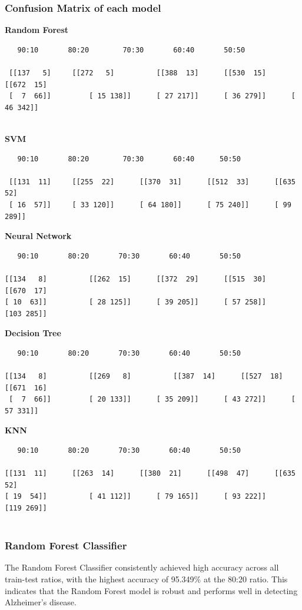 \documentclass[a4paper,12pt]{report}
\begin{document}
\subsubsection {Confusion Matrix of each model}
\textbf {Random Forest}
\begin{verbatim}
   90:10       80:20        70:30       60:40       50:50

 [[137   5]		[[272   5]			[[388  13]		[[530  15]		[[672  15]
 [  7  66]]			[ 15 138]]		[ 27 217]]		[ 36 279]]		[ 46 342]]


\end{verbatim}
\textbf {SVM}
\begin{verbatim}
   90:10       80:20        70:30       60:40      50:50

 [[131  11]		[[255  22]		[[370  31]		[[512  33]		[[635  52]
 [ 16  57]]		[ 33 120]]		[ 64 180]]		[ 75 240]]		[ 99 289]]

\end{verbatim}
\textbf {Neural Network}
\begin{verbatim}
   90:10       80:20       70:30       60:40       50:50

[[134   8]			[[262  15]		[[372  29]		[[515  30]		[[670  17]
[ 10  63]]			[ 28 125]]		[ 39 205]]		[ 57 258]]		[103 285]]

\end{verbatim}
\textbf {Decision Tree}
\begin{verbatim}
   90:10       80:20       70:30       60:40       50:50

[[134   8]			[[269   8]			[[387  14]		[[527  18]		[[671  16]
 [  7  66]]			[ 20 133]]		[ 35 209]]		[ 43 272]]		[ 57 331]]

\end{verbatim}
\textbf {KNN}
\begin{verbatim}
   90:10       80:20       70:30       60:40       50:50

[[131  11]		[[263  14]		[[380  21]		[[498  47]		[[635  52]
[ 19  54]]			[ 41 112]]		[ 79 165]]		[ 93 222]]		[119 269]]
 
\end{verbatim}

\subsubsection{Random Forest Classifier}

The Random Forest Classifier consistently achieved high accuracy across all train-test ratios, with the highest accuracy of 95.349\% at the 80:20 ratio. This indicates that the Random Forest model is robust and performs well in detecting Alzheimer's disease.
\end{document}
